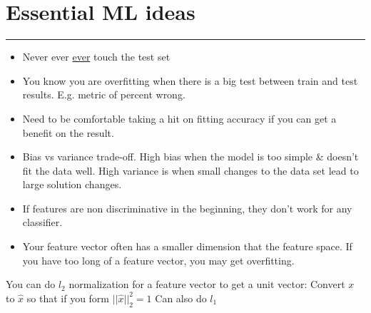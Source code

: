 \section{Essential ML ideas}
\smallskip \hrule height 2pt \smallskip

\begin{itemize}
	\item Never ever \underline{ever} touch the test set
	\item You know you are overfitting when there is a big test between train and test results.  E.g. metric of percent wrong. 
	\item Need to be comfortable taking a hit on fitting accuracy if you can get a benefit on the result.
	\item Bias vs variance trade-off.  
		High bias when the model is too simple \& doesn't fit the data well.  
		High variance is when small changes to the data set lead to large solution changes. 
	\item If features are non discriminative in the beginning, they don't work for any classifier.  %
	\item Your feature vector often has a smaller dimension that the feature space.    %
		If you have too long of a feature vector, you may get overfitting. 
\end{itemize}

You can do $l_2$ normalization for a feature vector to get a unit vector:   %
	Convert $x$ to $\hat{x}$ so that if you form $||\hat{x}||_2^2 = 1$
	Can also do $l_1$  
